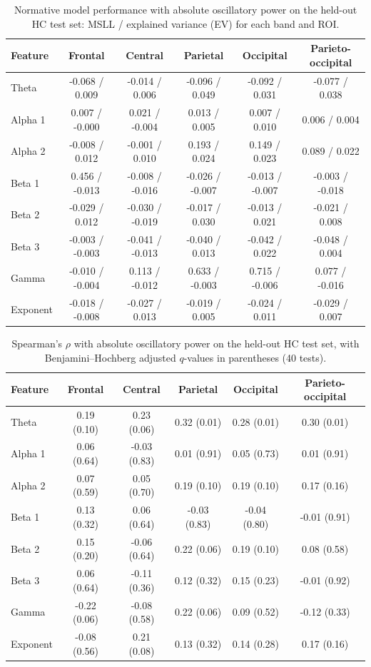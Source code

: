 \documentclass[11pt]{article}
\begin{document}
\begin{table}[ht]
\centering
\caption{Normative model performance with absolute oscillatory power on the held-out HC test set: MSLL / explained variance (EV) for each band and ROI.}
\label{tab:ab_msll}
\small
\begin{tabular}{@{}lccccc@{}}
\toprule
Feature & Frontal & Central & Parietal & Occipital & Parieto-occipital \\
\midrule
Theta & -0.068 / 0.009 & -0.014 / 0.006 & -0.096 / 0.049 & -0.092 / 0.031 & -0.077 / 0.038 \\
Alpha 1 & 0.007 / -0.000 & 0.021 / -0.004 & 0.013 / 0.005 & 0.007 / 0.010 & 0.006 / 0.004 \\
Alpha 2 & -0.008 / 0.012 & -0.001 / 0.010 & 0.193 / 0.024 & 0.149 / 0.023 & 0.089 / 0.022 \\
Beta 1 & 0.456 / -0.013 & -0.008 / -0.016 & -0.026 / -0.007 & -0.013 / -0.007 & -0.003 / -0.018 \\
Beta 2 & -0.029 / 0.012 & -0.030 / -0.019 & -0.017 / 0.030 & -0.013 / 0.021 & -0.021 / 0.008 \\
Beta 3 & -0.003 / -0.003 & -0.041 / -0.013 & -0.040 / 0.013 & -0.042 / 0.022 & -0.048 / 0.004 \\
Gamma & -0.010 / -0.004 & 0.113 / -0.012 & 0.633 / -0.003 & 0.715 / -0.006 & 0.077 / -0.016 \\
Exponent & -0.018 / -0.008 & -0.027 / 0.013 & -0.019 / 0.005 & -0.024 / 0.011 & -0.029 / 0.007 \\
\bottomrule
\end{tabular}
\end{table}

\begin{table}[ht]
\centering
\caption{Spearman's $\rho$ with absolute oscillatory power on the held-out HC test set, with Benjamini--Hochberg adjusted $q$-values in parentheses (40 tests).}
\label{tab:ab_rho}
\small
\begin{tabular}{@{}lccccc@{}}
\toprule
Feature & Frontal & Central & Parietal & Occipital & Parieto-occipital \\
\midrule
Theta & 0.19 (0.10) & 0.23 (0.06) & 0.32 (0.01) & 0.28 (0.01) & 0.30 (0.01) \\
Alpha 1 & 0.06 (0.64) & -0.03 (0.83) & 0.01 (0.91) & 0.05 (0.73) & 0.01 (0.91) \\
Alpha 2 & 0.07 (0.59) & 0.05 (0.70) & 0.19 (0.10) & 0.19 (0.10) & 0.17 (0.16) \\
Beta 1 & 0.13 (0.32) & 0.06 (0.64) & -0.03 (0.83) & -0.04 (0.80) & -0.01 (0.91) \\
Beta 2 & 0.15 (0.20) & -0.06 (0.64) & 0.22 (0.06) & 0.19 (0.10) & 0.08 (0.58) \\
Beta 3 & 0.06 (0.64) & -0.11 (0.36) & 0.12 (0.32) & 0.15 (0.23) & -0.01 (0.92) \\
Gamma & -0.22 (0.06) & -0.08 (0.58) & 0.22 (0.06) & 0.09 (0.52) & -0.12 (0.33) \\
Exponent & -0.08 (0.56) & 0.21 (0.08) & 0.13 (0.32) & 0.14 (0.28) & 0.17 (0.16) \\
\bottomrule
\end{tabular}
\end{table}
\end{document}
